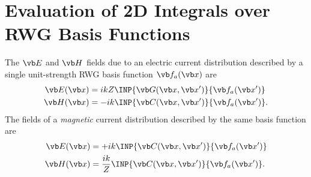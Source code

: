 \newpage
\section{Evaluation of 2D Integrals over RWG Basis Functions}

The $\vb E$ and $\vb H$ fields due to an electric current distribution
described by a single unit-strength RWG basis function $\vb f_a(\vb x)$ 
are 
\begin{align}
  \vb E(\vb x) &= ikZ \INP{\vb G(\vb x, \vb x^\prime)}{\vb f_a(\vb x^\prime)}\\
  \vb H(\vb x) &= -ik \INP{\vb C(\vb x, \vb x^\prime)}{\vb f_a(\vb x^\prime)}.
\end{align}
The fields of a \textit{magnetic} current distribution
described by the same basis function are 
\begin{align}
  \vb E(\vb x) &= +ik \INP{\vb C(\vb x, \vb x^\prime)}{\vb f_a(\vb x^\prime)}\\
  \vb H(\vb x) &= \frac{ik}{Z} \INP{\vb C(\vb x, \vb x^\prime)}{\vb f_a(\vb x^\prime)}.
\end{align}

